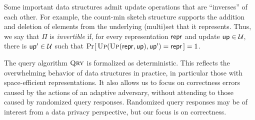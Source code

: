 Some important data structures admit update operations that are ``inverses'' of each other.  For example, the count-min sketch structure supports the addition and deletion of elements from the underlying (multi)set that it represents.  Thus, we say that $\Pi$ is {\em invertible} if, for every representation $\mathsf{repr}$ and update $\mathsf{up} \in \mathcal{U}$, there is $\mathsf{up}' \in \mathcal{U}$ such that $\Pr\hspace{-1pt}\left[\,\textsc{Up}(\textsc{Up}(\mathsf{repr},\mathsf{up}),\mathsf{up}') = \mathsf{repr}\,\right] = 1$.  

The query algorithm $\textsc{Qry}$ is formalized as deterministic.  This reflects the overwhelming behavior of data structures in practice, in particular those with space-efficient representations.  It also allows us to focus on correctness errors caused by the actions of an adaptive adversary, without attending to those caused by randomized query responses.  Randomized query responses may be of interest from a data privacy perspective, but our focus is on correctness.




